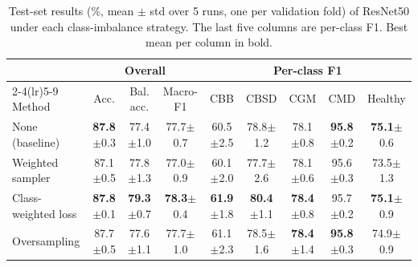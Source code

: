 \begin{table}[t]
\centering
\small
\caption{Test-set results (\%, mean $\pm$ std over 5 runs, one per validation fold) of ResNet50 under each class-imbalance strategy. The last five columns are per-class F1. Best mean per column in bold.}
\label{tab:imbalance-cv}
\begin{tabular}{lcccccccc}
\toprule
 & \multicolumn{3}{c}{Overall} & \multicolumn{5}{c}{Per-class F1} \\
\cmidrule(lr){2-4}\cmidrule(lr){5-9}
Method & Acc. & Bal. acc. & Macro-F1 & CBB & CBSD & CGM & CMD & Healthy \\
\midrule
None (baseline) & \textbf{87.8}$\pm$0.3 & 77.4$\pm$1.0 & 77.7$\pm$0.7 & 60.5$\pm$2.5 & 78.8$\pm$1.2 & 78.1$\pm$0.8 & \textbf{95.8}$\pm$0.2 & \textbf{75.1}$\pm$0.6 \\
Weighted sampler & 87.1$\pm$0.5 & 77.8$\pm$1.3 & 77.0$\pm$0.9 & 60.1$\pm$2.0 & 77.7$\pm$2.6 & 78.1$\pm$0.6 & 95.6$\pm$0.3 & 73.5$\pm$1.3 \\
Class-weighted loss & \textbf{87.8}$\pm$0.1 & \textbf{79.3}$\pm$0.7 & \textbf{78.3}$\pm$0.4 & \textbf{61.9}$\pm$1.8 & \textbf{80.4}$\pm$1.1 & \textbf{78.4}$\pm$0.8 & 95.7$\pm$0.2 & \textbf{75.1}$\pm$0.9 \\
Oversampling & 87.7$\pm$0.5 & 77.6$\pm$1.1 & 77.7$\pm$1.0 & 61.1$\pm$2.3 & 78.5$\pm$1.6 & \textbf{78.4}$\pm$1.4 & \textbf{95.8}$\pm$0.3 & 74.9$\pm$0.9 \\
\bottomrule
\end{tabular}
\end{table}
